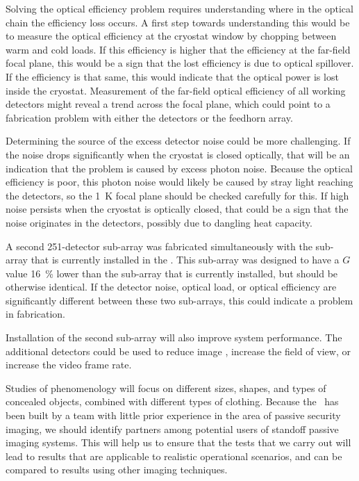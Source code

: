 Solving the optical efficiency problem requires understanding where in the optical chain the efficiency loss occurs.
A first step towards understanding this would be to measure the optical efficiency at the cryostat window by chopping between warm and cold loads.
If this efficiency is higher that the efficiency at the far-field focal plane, this would be a sign that the lost efficiency is due to optical spillover.
If the efficiency is that same, this would indicate that the optical power is lost inside the cryostat.
Measurement of the far-field optical efficiency of all working detectors might reveal a trend across the focal plane, which could point to a fabrication problem with either the detectors or the feedhorn array.

Determining the source of the excess detector noise could be more challenging.
If the noise drops significantly when the cryostat is closed optically, that will be an indication that the problem is caused by excess photon noise.
Because the optical efficiency is poor, this photon noise would likely be caused by stray light reaching the detectors, so the \SI{1}{\K} focal plane should be checked carefully for this.
If high noise persists when the cryostat is optically closed, that could be a sign that the noise originates in the detectors, possibly due to dangling heat capacity.

A second 251-detector sub-array was fabricated simultaneously with the sub-array that is currently installed in the \Imager.
This sub-array was designed to have a $G$ value \SI{16}{\percent} lower than the sub-array that is currently installed, but should be otherwise identical.
If the detector noise, optical load, or optical efficiency are significantly different between these two sub-arrays, this could indicate a problem in fabrication.


Installation of the second sub-array will also improve system performance.
The additional detectors could be used to reduce image \NETD, increase the field of view, or increase the video frame rate.

Studies of phenomenology will focus on different sizes, shapes, and types of concealed objects, combined with different types of clothing.
Because the \Imager\ has been built by a team with little prior experience in the area of passive security imaging, we should identify partners among potential users of standoff passive imaging systems.
This will help us to ensure that the tests that we carry out will lead to results that are applicable to realistic operational scenarios, and can be compared to results using other imaging techniques.

